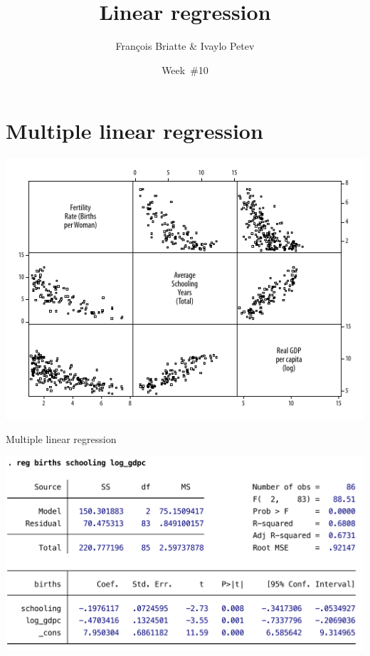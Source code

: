 \documentclass[t]{beamer}
\title{Linear regression}
\author{François Briatte \& Ivaylo Petev}
\date{Week~\#10}
\begin{document}
    

    \frame[plain]{
        \titlepage\\[7em]
        \tableofcontents[hideallsubsections]
        }

    

    \section{Multiple linear regression}

	\begin{frame}[c]%
			
		\begin{center}
			\includegraphics[width=\textwidth]{mreg-gr-mat.pdf}
		\end{center}
				
	\end{frame}
	
	\begin{frame}[c]{Multiple linear regression}
			
		\begin{center}
			\includegraphics[width=\textwidth]{mreg-output.pdf}
		\end{center}
				
	\end{frame}	
	
\end{document}
